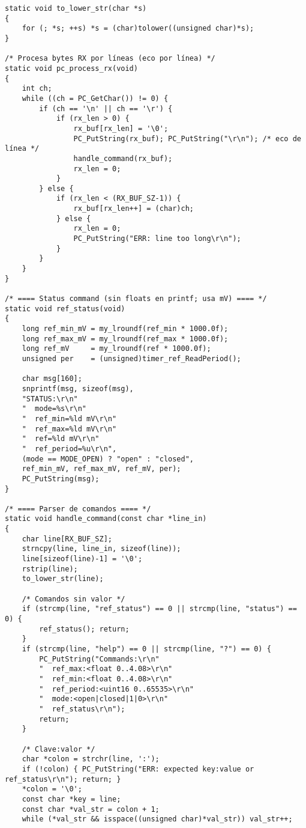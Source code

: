 \begin{lstlisting}[style=cstyle,
	caption={Código desarrollado para la implementación de los compensadores con el PSoC en lenguaje C.},
	label={c:psoc}
	]
static void to_lower_str(char *s)
{
	for (; *s; ++s) *s = (char)tolower((unsigned char)*s);
}

/* Procesa bytes RX por líneas (eco por línea) */
static void pc_process_rx(void)
{
	int ch;
	while ((ch = PC_GetChar()) != 0) {
		if (ch == '\n' || ch == '\r') {
			if (rx_len > 0) {
				rx_buf[rx_len] = '\0';
				PC_PutString(rx_buf); PC_PutString("\r\n"); /* eco de línea */
				handle_command(rx_buf);
				rx_len = 0;
			}
		} else {
			if (rx_len < (RX_BUF_SZ-1)) {
				rx_buf[rx_len++] = (char)ch;
			} else {
				rx_len = 0;
				PC_PutString("ERR: line too long\r\n");
			}
		}
	}
}

/* ==== Status command (sin floats en printf; usa mV) ==== */
static void ref_status(void)
{
	long ref_min_mV = my_lroundf(ref_min * 1000.0f);
	long ref_max_mV = my_lroundf(ref_max * 1000.0f);
	long ref_mV     = my_lroundf(ref * 1000.0f);
	unsigned per    = (unsigned)timer_ref_ReadPeriod();
	
	char msg[160];
	snprintf(msg, sizeof(msg),
	"STATUS:\r\n"
	"  mode=%s\r\n"
	"  ref_min=%ld mV\r\n"
	"  ref_max=%ld mV\r\n"
	"  ref=%ld mV\r\n"
	"  ref_period=%u\r\n",
	(mode == MODE_OPEN) ? "open" : "closed",
	ref_min_mV, ref_max_mV, ref_mV, per);
	PC_PutString(msg);
}

/* ==== Parser de comandos ==== */
static void handle_command(const char *line_in)
{
	char line[RX_BUF_SZ];
	strncpy(line, line_in, sizeof(line));
	line[sizeof(line)-1] = '\0';
	rstrip(line);
	to_lower_str(line);
	
	/* Comandos sin valor */
	if (strcmp(line, "ref_status") == 0 || strcmp(line, "status") == 0) {
		ref_status(); return;
	}
	if (strcmp(line, "help") == 0 || strcmp(line, "?") == 0) {
		PC_PutString("Commands:\r\n"
		"  ref_max:<float 0..4.08>\r\n"
		"  ref_min:<float 0..4.08>\r\n"
		"  ref_period:<uint16 0..65535>\r\n"
		"  mode:<open|closed|1|0>\r\n"
		"  ref_status\r\n");
		return;
	}
	
	/* Clave:valor */
	char *colon = strchr(line, ':');
	if (!colon) { PC_PutString("ERR: expected key:value or ref_status\r\n"); return; }
	*colon = '\0';
	const char *key = line;
	const char *val_str = colon + 1;
	while (*val_str && isspace((unsigned char)*val_str)) val_str++;
	

\end{lstlisting}
